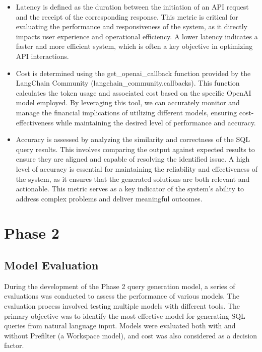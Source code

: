     \begin{itemize}
        \item Latency is defined as the duration between the initiation of an API request and the receipt of the corresponding response. This metric is critical for evaluating the performance and responsiveness of the system, as it directly impacts user experience and operational efficiency. A lower latency indicates a faster and more efficient system, which is often a key objective in optimizing API interactions.
        \item Cost is determined using the get\_openai\_callback function provided by the LangChain Community (langchain\_community.callbacks). This function calculates the token usage and associated cost based on the specific OpenAI model employed. By leveraging this tool, we can accurately monitor and manage the financial implications of utilizing different models, ensuring cost-effectiveness while maintaining the desired level of performance and accuracy.
        \item Accuracy is assessed by analyzing the similarity and correctness of the SQL query results. This involves comparing the output against expected results to ensure they are aligned and capable of resolving the identified issue. A high level of accuracy is essential for maintaining the reliability and effectiveness of the system, as it ensures that the generated solutions are both relevant and actionable. This metric serves as a key indicator of the system's ability to address complex problems and deliver meaningful outcomes.
    \end{itemize}
\pagebreak

\section{Phase 2}
    \subsection{Model Evaluation}
    During the development of the Phase 2 query generation model, a series of evaluations was conducted to assess the performance of various models. The evaluation process involved testing multiple models with different tools. The primary objective was to identify the most effective model for generating SQL queries from natural language input. Models were evaluated both with and without Prefilter (a Workspace model), and cost was also considered as a decision factor.
    
